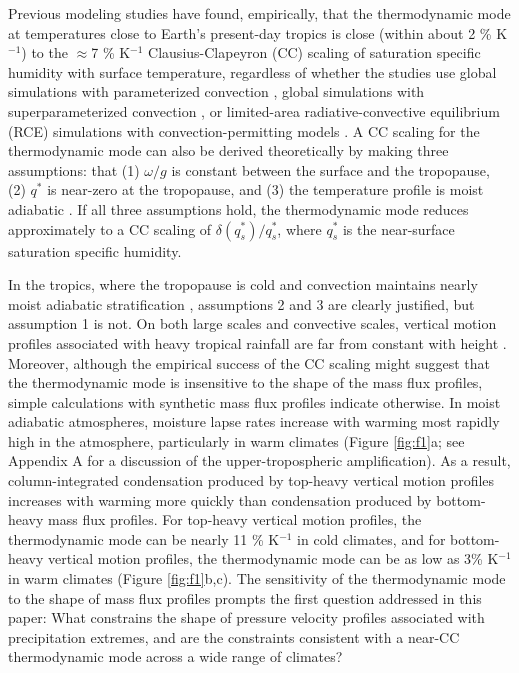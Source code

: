 \documentclass[twocol]{ametsoc}
\begin{document}
Previous modeling studies have found, empirically, that the thermodynamic mode at temperatures close to Earth's present-day tropics is close (within about 2 \% K$^{-1}$) to the $\approx$7 \% K$^{-1}$  Clausius-Clapeyron (CC) scaling of saturation specific humidity with surface temperature, regardless of whether the studies use global simulations with parameterized convection \citep{OGorman2009TheChange,Ogorman2009ScalingGCM,Chen2019ThermodynamicEvents}, global simulations with superparameterized convection \citep{Fildier2017SimultaneousChange}, or limited-area radiative-convective equilibrium (RCE) simulations with convection-permitting models \citep{Muller2011IntensificationModel,Romps2011ResponseWarming,Muller2013ImpactWarming}. A CC scaling for the thermodynamic mode can also be derived theoretically by making three assumptions: that (1) $\omega/g$ is constant between the surface and the tropopause, (2) $q^*$ is near-zero at the tropopause, and (3) the temperature profile is moist adiabatic \citep{Ogorman2009ScalingGCM,Muller2011IntensificationModel}. If all three assumptions hold, the thermodynamic mode reduces approximately to a CC scaling of $\delta(q^*_s)/q^*_s$, where $q^*_s$ is the near-surface saturation specific humidity. 

In the tropics, where the tropopause is cold and convection maintains nearly moist adiabatic stratification \citep{Xu1989IsUnstable}, assumptions 2 and 3 are clearly justified, but assumption 1 is not. On both large scales and convective scales, vertical motion profiles associated with heavy tropical rainfall are far from constant with height \citep{Back2006GeographicPacific,Torri2017StableTropics,Moore2014AEffect}. Moreover, although the empirical success of the CC scaling might suggest that the thermodynamic mode is insensitive to the shape of the mass flux profiles, simple calculations with synthetic mass flux profiles indicate otherwise. In moist adiabatic atmospheres, moisture lapse rates increase with warming most rapidly high in the atmosphere, particularly in warm climates (Figure \ref{fig:f1}a; see Appendix A for a discussion of the upper-tropospheric amplification). As a result, column-integrated condensation produced by top-heavy vertical motion profiles increases with warming more quickly than condensation produced by bottom-heavy mass flux profiles. For top-heavy vertical motion profiles, the thermodynamic mode can be nearly 11 \% K$^{-1}$ in cold climates, and for bottom-heavy vertical motion profiles, the thermodynamic mode can be as low as 3\% K$^{-1}$ in warm climates (Figure \ref{fig:f1}b,c). The sensitivity of the thermodynamic mode to the shape of mass flux profiles prompts the first question addressed in this paper: What constrains the shape of pressure velocity profiles associated with precipitation extremes, and are the constraints consistent with a near-CC thermodynamic mode across a wide range of climates?
\end{document}
